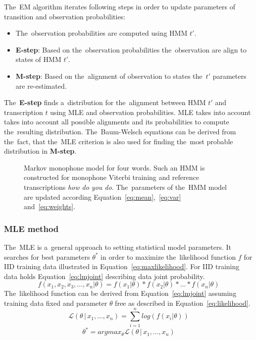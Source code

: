 The~\ac{EM} algorithm iterates following steps in order to update parameters of transition and observation probabilities:
\begin{itemize}
    \item The~observation probabilities are computed using \ac{HMM} $t'$. 
    \item {\bf E-step}: Based on the~observation probabilities the~observation are align to states of \ac{HMM} $t'$. 
    \item {\bf M-step}: Based on the~alignment of observation to states the~$t'$ parameters are re-estimated. 
\end{itemize}

The~{\bf E-step} finds a~distribution for the~alignment between \ac{HMM} $t'$ and transcription $t$ using \ac{MLE}\cite{gopinath1998maximum} and observation probabilities.
\ac{MLE} takes into account takes into account all possible alignments and its probabilities to compute the~resulting distribution.
The~Baum-Welsch equations can be derived from the~fact, that the~\ac{MLE} criterion is also used for finding the~most probable distribution in {\bf M-step}.\cite{huang2001spoken}

\begin{figure}[!htp]
    \begin{center}
    
    \caption{Markov monophone model for four words. Such an \ac{HMM} is constructed for monophone Viterbi training and reference transcriptions \textit{how do you do}. The~parameters of the~\ac{HMM} model are updated according Equation~\ref{eq:mean},~\ref{eq:var} and~\ref{eq:weights}.}
    \label{fig:hmm_words} 
    \end{center}
\end{figure}

\subsubsection*{\acl{MLE} method}
\label{sub:mle_method}
The~\ac{MLE} is a~general approach to setting statistical model parameters.
It searches for best parameters $\theta^*$ in order to maximize the~likelihood function $f$ for \ac{IID} training data illustrated in Equation~\ref{eq:maxlikelihood}.
For \ac{IID} training data holds Equation~\ref{eq:lmjoint} describing data joint probability. 
\begin{equation}\label{eq:lmjoint}
    f(x_1, x_2, x_3, \ldots, x_n | \theta) = f(x_1 | \theta) * f(x_2 | \theta) * \ldots * f(x_n | \theta)
\end{equation}
The~likelihood function can be derived from Equation~\ref{eq:lmjoint} assuming training data fixed and parameter $\theta$ free as described in Equation~\ref{eq:likelihood}.
\begin{equation}\label{eq:likelihood}
    \mathcal{L}(\theta\,|\,x_1,\ldots,x_n) = \sum_{i=1}^n log(f(x_i|\theta))
\end{equation}
\begin{equation}\label{eq:maxlikelihood}
    \theta^* = argmax_{\theta} \mathcal{L}(\theta\,|\,x_1,\ldots,x_n)
\end{equation}

